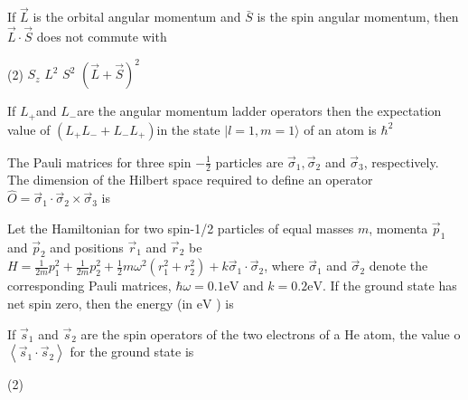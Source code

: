 \begin{enumerate}
\begin{minipage}{\textwidth}
\end{minipage}
\begin{minipage}{\textwidth}
	\item If $\vec{L}$ is the orbital angular momentum and $\bar{S}$ is the spin angular momentum, then $\vec{L} \cdot \vec{S}$ does not commute with
\end{minipage}
\begin{tasks}(2)
	\task[\textbf{A.}] $S_{z}$ 
	\task[\textbf{B.}]$L^{2}$
	\task[\textbf{C.}]$S^{2}$
	\task[\textbf{D.}]$(\vec{L}+\vec{S})^{2}$
\end{tasks}
\begin{minipage}{\textwidth}
	\item If $L_{+}$and $L_{-}$are the angular momentum ladder operators then the expectation value of $\left(L_{+} L_{-}+L_{-} L_{+}\right)$in the state $|l=1, m=1\rangle$ of an atom is $\hbar^{2}$
\end{minipage}
\begin{minipage}{\textwidth}
	\item The Pauli matrices for three spin $-\frac{1}{2}$ particles are $\vec{\sigma}_{1}, \vec{\sigma}_{2}$ and $\vec{\sigma}_{3}$, respectively. The dimension of the Hilbert space required to define an operator $\hat{O}=\vec{\sigma}_{1} \cdot \vec{\sigma}_{2} \times \vec{\sigma}_{3}$ is
\end{minipage}
\begin{minipage}{\textwidth}
	\item Let the Hamiltonian for two spin-1/2 particles of equal masses $m$, momenta $\vec{p}_{1}$ and $\vec{p}_{2}$ and positions $\vec{r}_{1}$ and $\vec{r}_{2}$ be $H=\frac{1}{2 m} p_{1}^{2}+\frac{1}{2 m} p_{2}^{2}+\frac{1}{2} m \omega^{2}\left(r_{1}^{2}+r_{2}^{2}\right)+k \vec{\sigma}_{1} \cdot \vec{\sigma}_{2}$, where $\vec{\sigma}_{1}$ and $\vec{\sigma}_{2}$ denote the corresponding Pauli matrices, $\hbar \omega=0.1 \mathrm{eV}$ and $k=0.2 \mathrm{eV}$. If the ground state has net spin zero, then the energy (in $\mathrm{eV}$ ) is
\end{minipage}
\begin{minipage}{\textwidth}
	\item If $\vec{s}_{1}$ and $\vec{s}_{2}$ are the spin operators of the two electrons of a He atom, the value o $\left\langle\vec{s}_{1} \cdot \vec{s}_{2}\right\rangle$ for the ground state is
\end{minipage}
\begin{tasks}(2)

\end{tasks}
\end{enumerate}
